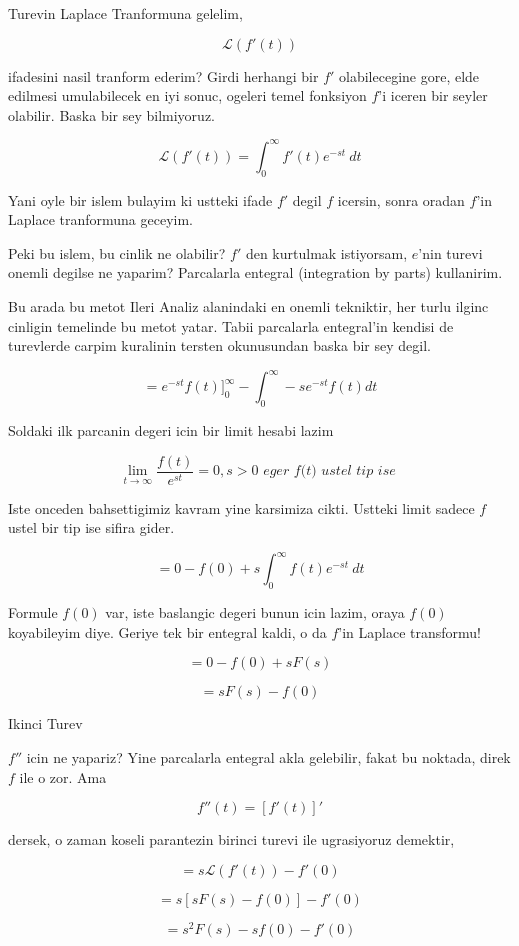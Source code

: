 \documentclass[12pt,fleqn]{article}
\begin{document}
Turevin Laplace Tranformuna gelelim,

\[ \mathcal{L}(f'(t)) \]

ifadesini nasil tranform ederim? Girdi herhangi bir $f'$ olabilecegine
gore, elde edilmesi umulabilecek en iyi sonuc, ogeleri temel fonksiyon
$f$'i iceren bir seyler olabilir. Baska bir sey bilmiyoruz. 

\[ \mathcal{L}(f'(t)) = \int_0^{\infty} f'(t)e^{-st} \ dt \]

Yani oyle bir islem bulayim ki ustteki ifade $f'$ degil $f$ icersin, sonra
oradan $f$'in Laplace tranformuna geceyim. 

Peki bu islem, bu cinlik ne olabilir? $f'$ den kurtulmak istiyorsam,
$e$'nin turevi onemli degilse ne yaparim? Parcalarla entegral (integration
by parts) kullanirim. 

Bu arada bu metot Ileri Analiz alanindaki en onemli tekniktir, her turlu
ilginc cinligin temelinde bu metot yatar. Tabii parcalarla entegral'in
kendisi de turevlerde carpim kuralinin tersten okunusundan baska bir sey
degil.

\[ = e^{-st}f(t) \bigg]_{0}^{\infty}  - 
\int_{0}^{\infty} -s e^{-st}f(t)dt
 \]

Soldaki ilk parcanin degeri icin bir limit hesabi lazim

\[ \lim_{t \to \infty} \frac{f(t)}{e^{st}} = 0 
, s>0
\textit{ eger f(t) ustel tip ise }
\]

Iste onceden bahsettigimiz kavram yine karsimiza cikti. Ustteki limit
sadece $f$ ustel bir tip ise sifira gider. 

\[=  0 - f(0) + s \int_0^{\infty} f(t)e^{-st} \ dt
 \]

Formule $f(0)$ var, iste baslangic degeri bunun icin lazim, oraya $f(0)$
koyabileyim diye. Geriye tek bir entegral kaldi, o da $f$'in Laplace
transformu! 

\[=  0 - f(0) + s F(s) \]

\[=  s F(s) - f(0) \]

Ikinci Turev

$f''$ icin ne yapariz? Yine parcalarla entegral akla gelebilir, fakat bu
noktada, direk $f$ ile o zor. Ama 

\[ f''(t) = [f'(t)]' \]

dersek, o zaman koseli parantezin birinci turevi ile ugrasiyoruz demektir,

\[ = s \mathcal{L} (f'(t)) - f'(0)\]

\[ =  s[sF(s) -f(0)] - f'(0)\]

\[ =  s^2F(s) - sf(0) - f'(0)\]
\end{document}
